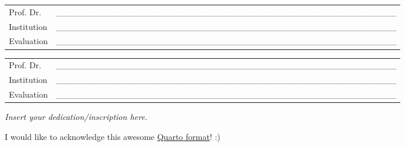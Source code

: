 \documentclass[
  12pt,
  a4paper,
  oneside]{tesesusp}
\begin{document}
\begin{folhadeaprovacao}
\vspace*{0.5cm}

\noindent
\begin{tabular}{m{2cm} P{14cm}}
  Prof. Dr. & \_\_\_\_\_\_\_\_\_\_\_\_\_\_\_\_\_\_\_\_\_\_\_\_\_\_\_\_\_\_\_\_\_\_\_\_\_\_\_\_\_\_\_\_\_\_\_\_\_\_\_\_\_\_\_ \\
  Institution & \_\_\_\_\_\_\_\_\_\_\_\_\_\_\_\_\_\_\_\_\_\_\_\_\_\_\_\_\_\_\_\_\_\_\_\_\_\_\_\_\_\_\_\_\_\_\_\_\_\_\_\_\_\_\_ \\
  Evaluation & \_\_\_\_\_\_\_\_\_\_\_\_\_\_\_\_\_\_\_\_\_\_\_\_\_\_\_\_\_\_\_\_\_\_\_\_\_\_\_\_\_\_\_\_\_\_\_\_\_\_\_\_\_\_\_ \\
\end{tabular}

\vspace*{0.5cm}

\noindent
\begin{tabular}{m{2cm} P{14cm}}
  Prof. Dr. & \_\_\_\_\_\_\_\_\_\_\_\_\_\_\_\_\_\_\_\_\_\_\_\_\_\_\_\_\_\_\_\_\_\_\_\_\_\_\_\_\_\_\_\_\_\_\_\_\_\_\_\_\_\_\_ \\
  Institution & \_\_\_\_\_\_\_\_\_\_\_\_\_\_\_\_\_\_\_\_\_\_\_\_\_\_\_\_\_\_\_\_\_\_\_\_\_\_\_\_\_\_\_\_\_\_\_\_\_\_\_\_\_\_\_ \\
  Evaluation & \_\_\_\_\_\_\_\_\_\_\_\_\_\_\_\_\_\_\_\_\_\_\_\_\_\_\_\_\_\_\_\_\_\_\_\_\_\_\_\_\_\_\_\_\_\_\_\_\_\_\_\_\_\_\_ \\
\end{tabular}
\end{folhadeaprovacao}


\begin{dedicatoria}
  \vspace*{\fill}
  \centering
  \noindent
  \textit{
  Insert your dedication/inscription here.
  }
	\vspace*{\fill}
\end{dedicatoria}


\begin{agradecimentos}
  \noindent
  I would like to acknowledge this awesome \href{https://github.com/danielvartan/tesesusp}{Quarto format}! :)
\end{agradecimentos}
\end{document}
